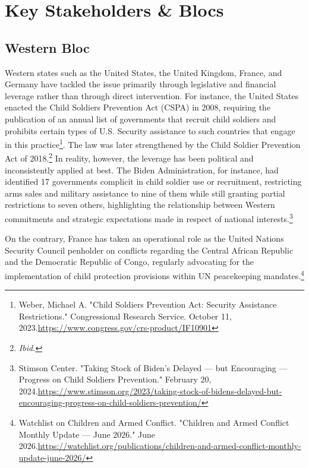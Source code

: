 \section{Key Stakeholders \& Blocs}


\subsection{Western Bloc}

Western states such as the United States, the United Kingdom, France, and Germany have tackled the issue primarily through legislative and financial leverage rather than through direct intervention. For instance, the United States enacted the Child Soldiers Prevention Act (CSPA) in 2008, requiring the publication of an annual list of governments that recruit child soldiers and prohibits certain types of U.S. Security assistance to such countries that engage in this practice\footnote{Weber, Michael A. "Child Soldiers Prevention Act: Security Assistance Restrictions." Congressional Research Service. October 11, 2023.\url{https://www.congress.gov/crs-product/IF10901}}. The law was later strengthened by the Child Soldier Prevention Act of 2018.\footnote{\emph{Ibid.}} In reality, however, the leverage has been political and inconsistently applied at best. The Biden Administration, for instance, had identified 17 governments complicit in child soldier use or recruitment, restricting arms sales and military assistance to nine of them while still granting partial restrictions to seven others, highlighting the relationship between Western commitments and strategic expectations made in respect of national interests.\footnote{Stimson Center. "Taking Stock of Biden's Delayed — but Encouraging — Progress on Child Soldiers Prevention." February 20, 2024.\url{https://www.stimson.org/2023/taking-stock-of-bidens-delayed-but-encouraging-progress-on-child-soldiers-prevention/}}

On the contrary, France has taken an operational role as the United Nations Security Council penholder on conflicts regarding the Central African Republic and the Democratic Republic of Congo, regularly advocating for the implementation of child protection provisions within UN peacekeeping mandates.\footnote{Watchlist on Children and Armed Conflict. "Children and Armed Conflict Monthly Update — June 2026." June 2026.\url{https://watchlist.org/publications/children-and-armed-conflict-monthly-update-june-2026/}}

